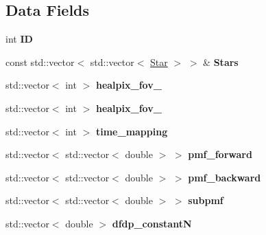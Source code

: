 \subsection*{Data Fields}
\begin{DoxyCompactItemize}
\item 
\mbox{\label{classLikelihoodData_a9cb6c7ac3a9bfb1c9108ead8ea8fde91}} 
int {\bfseries ID}
\item 
\mbox{\label{classLikelihoodData_a4c970663e2cd6c3e0b1a8e353854ce5f}} 
const std\+::vector$<$ std\+::vector$<$ \hyperlink{classStar}{Star} $>$ $>$ \& {\bfseries Stars}
\item 
\mbox{\label{classLikelihoodData_a0c7b79c0856b8d63180245c7a423b262}} 
std\+::vector$<$ int $>$ {\bfseries healpix\+\_\+fov\+\_}
\item 
\mbox{\label{classLikelihoodData_a2caf37a2748bbb0bd91b818c3af51502}} 
std\+::vector$<$ int $>$ {\bfseries healpix\+\_\+fov\+\_}
\item 
\mbox{\label{classLikelihoodData_ab996d0af29ea194954e9ddfeba2bea9e}} 
std\+::vector$<$ int $>$ {\bfseries time\+\_\+mapping}
\item 
\mbox{\label{classLikelihoodData_a930a1b35ff6c789074f50dc56bada379}} 
std\+::vector$<$ std\+::vector$<$ double $>$ $>$ {\bfseries pmf\+\_\+forward}
\item 
\mbox{\label{classLikelihoodData_aaf104aa3161c2a6be5f1db9aa946c4ab}} 
std\+::vector$<$ std\+::vector$<$ double $>$ $>$ {\bfseries pmf\+\_\+backward}
\item 
\mbox{\label{classLikelihoodData_a22d6828dd96c1d54a3b70fe0ef613b15}} 
std\+::vector$<$ std\+::vector$<$ double $>$ $>$ {\bfseries subpmf}
\item 
\mbox{\label{classLikelihoodData_ac6d1fcbd9277f3858edf5330f4ddf9ba}} 
std\+::vector$<$ double $>$ {\bfseries dfdp\+\_\+constantN}
\item 
\mbox{\label{classLikelihoodData_a5778396081010881534302e7cc999b1f}} 

\end{DoxyCompactItemize}
